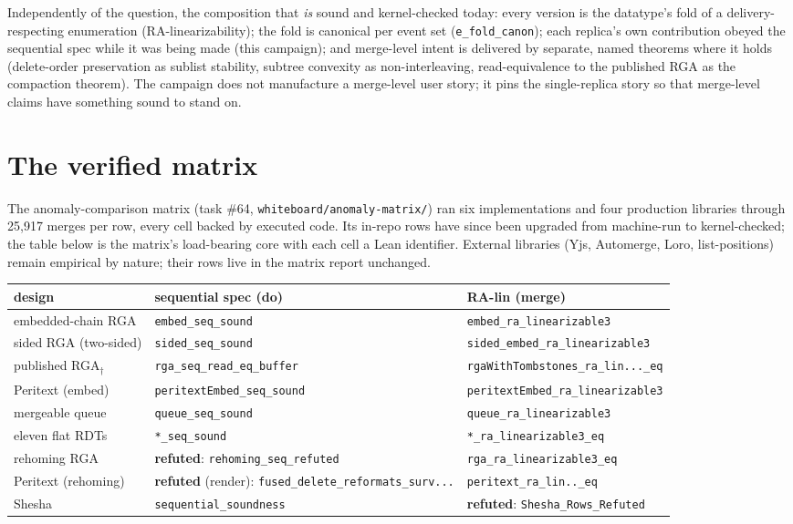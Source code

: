 \documentclass[11pt]{article}
\newcommand{\code}[1]{\texttt{#1}}
\begin{document}
Independently of the question, the composition that \emph{is} sound
and kernel-checked today: every version is the datatype's fold of a
delivery-respecting enumeration (RA-linearizability); the fold is
canonical per event set (\code{e\_fold\_canon}); each replica's own
contribution obeyed the sequential spec while it was being made (this
campaign); and merge-level intent is delivered by separate, named
theorems where it holds (delete-order preservation as sublist
stability, subtree convexity as non-interleaving, read-equivalence to
the published RGA as the compaction theorem). The campaign does not
manufacture a merge-level user story; it pins the single-replica story
so that merge-level claims have something sound to stand on.

\section{The verified matrix}
\label{sec:matrix}

The anomaly-comparison matrix (task \#64,
\code{whiteboard/anomaly-matrix/}) ran six implementations and four
production libraries through 25{,}917 merges per row, every cell
backed by executed code. Its in-repo rows have since been upgraded
from machine-run to kernel-checked; the table below is the matrix's
load-bearing core with each cell a Lean identifier. External libraries
(Yjs, Automerge, Loro, list-positions) remain empirical by nature;
their rows live in the matrix report unchanged.

\begin{center}\scriptsize
\begin{tabular}{@{}lll@{}}
\toprule
design & sequential spec (do) & RA-lin (merge) \\
\midrule
embedded-chain RGA & \code{embed\_seq\_sound} &
  \code{embed\_ra\_linearizable3} \\
sided RGA (two-sided) & \code{sided\_seq\_sound} &
  \code{sided\_embed\_ra\_linearizable3} \\
published RGA$_\dagger$ & \code{rga\_seq\_read\_eq\_buffer} &
  \code{rgaWithTombstones\_ra\_lin...\_eq} \\
Peritext (embed) & \code{peritextEmbed\_seq\_sound} &
  \code{peritextEmbed\_ra\_linearizable3} \\
mergeable queue & \code{queue\_seq\_sound} &
  \code{queue\_ra\_linearizable3} \\
eleven flat RDTs & \code{*\_seq\_sound} &
  \code{*\_ra\_linearizable3\_eq} \\
\midrule
rehoming RGA & \textbf{refuted}: \code{rehoming\_seq\_refuted} &
  \code{rga\_ra\_linearizable3\_eq} \\
Peritext (rehoming) & \textbf{refuted} (render):
  \code{fused\_delete\_reformats\_surv...} &
  \code{peritext\_ra\_lin..\_eq} \\
Shesha & \code{sequential\_soundness} &
  \textbf{refuted}: \code{Shesha\_Rows\_Refuted} \\
\bottomrule
\end{tabular}
\end{center}
\end{document}
